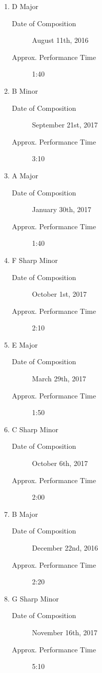 \documentclass{jarticle}
\begin{document}
\begin{enumerate}
\item D Major
	\begin{description}
	\item[Date of Composition] August 11th, 2016
	\item[Approx. Performance Time] 1:40
	\end{description}
\item B Minor
	\begin{description}
	\item[Date of Composition] September 21st, 2017
	\item[Approx. Performance Time] 3:10
	\end{description}

\item A Major
	\begin{description}
	\item[Date of Composition] January 30th, 2017
	\item[Approx. Performance Time] 1:40
	\end{description}
\item F Sharp Minor
	\begin{description}
	\item[Date of Composition] October 1st, 2017
	\item[Approx. Performance Time] 2:10
	\end{description}

\item E Major
	\begin{description}
	\item[Date of Composition] March 29th, 2017
	\item[Approx. Performance Time] 1:50
	\end{description}
\item C Sharp Minor
	\begin{description}
	\item[Date of Composition] October 6th, 2017
	\item[Approx. Performance Time] 2:00
	\end{description}

\item B Major
	\begin{description}
	\item[Date of Composition] December 22nd, 2016
	\item[Approx. Performance Time] 2:20
	\end{description}
\item G Sharp Minor
	\begin{description}
	\item[Date of Composition] November 16th, 2017
	\item[Approx. Performance Time] 5:10
	\end{description}
\end{enumerate}
\end{document}
